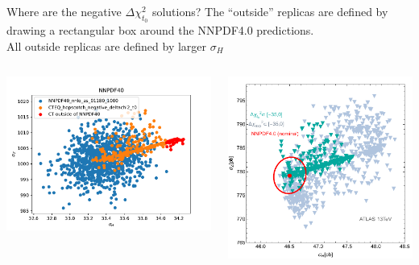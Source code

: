 \documentclass[aspectratio=169,10pt]{beamer}
\begin{document}
\begin{frame}[t]{Where are the negative $\Delta\chi^2_{t_0}$ solutions?}
  The ``outside'' replicas are defined by drawing a rectangular box around the NNPDF4.0 predictions.\\
  \vspace*{0.5em}
  All outside replicas are defined by larger $\sigma_H$
  \begin{columns}
    \begin{column}{0.48\textwidth}
      \vspace*{-1mm}
      \includegraphics[width=.9\textwidth]{NNPDF40.pdf}
    \end{column}
    \hspace*{0.01\textwidth}
    \begin{column}{0.48\textwidth}
      \includegraphics[width=.7\textwidth]{220512_scatter_HZ_exp_t0.pdf}
    \end{column}
  \end{columns}
\end{frame}
\end{document}

